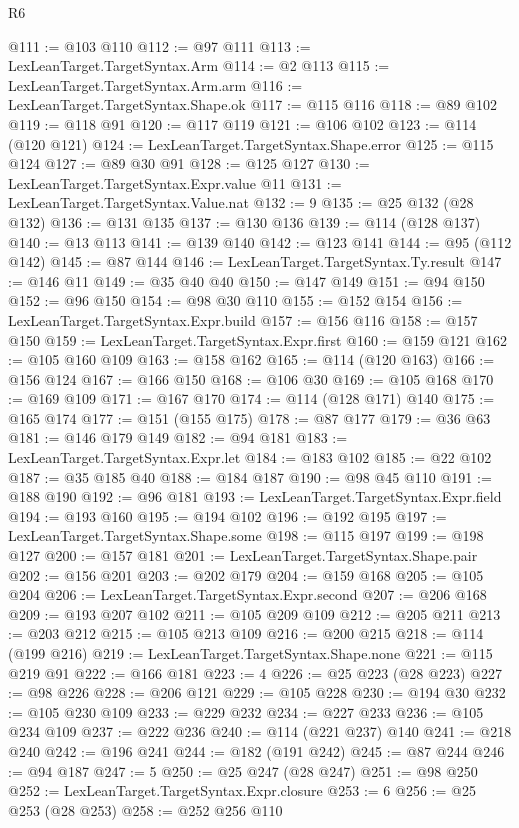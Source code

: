 \begin{lexlean}{R6}
\begin{coremodule}
@111 := @103 @110
@112 := @97 @111
@113 := LexLeanTarget.TargetSyntax.Arm
@114 := @2 @113
@115 := LexLeanTarget.TargetSyntax.Arm.arm
@116 := LexLeanTarget.TargetSyntax.Shape.ok
@117 := @115 @116
@118 := @89 @102
@119 := @118 @91
@120 := @117 @119
@121 := @106 @102
@123 := @114 (@120 @121)
@124 := LexLeanTarget.TargetSyntax.Shape.error
@125 := @115 @124
@127 := @89 @30 @91
@128 := @125 @127
@130 := LexLeanTarget.TargetSyntax.Expr.value @11
@131 := LexLeanTarget.TargetSyntax.Value.nat
@132 := 9
@135 := @25 @132 (@28 @132)
@136 := @131 @135
@137 := @130 @136
@139 := @114 (@128 @137)
@140 := @13 @113
@141 := @139 @140
@142 := @123 @141
@144 := @95 (@112 @142)
@145 := @87 @144
@146 := LexLeanTarget.TargetSyntax.Ty.result
@147 := @146 @11
@149 := @35 @40 @40
@150 := @147 @149
@151 := @94 @150
@152 := @96 @150
@154 := @98 @30 @110
@155 := @152 @154
@156 := LexLeanTarget.TargetSyntax.Expr.build
@157 := @156 @116
@158 := @157 @150
@159 := LexLeanTarget.TargetSyntax.Expr.first
@160 := @159 @121
@162 := @105 @160 @109
@163 := @158 @162
@165 := @114 (@120 @163)
@166 := @156 @124
@167 := @166 @150
@168 := @106 @30
@169 := @105 @168
@170 := @169 @109
@171 := @167 @170
@174 := @114 (@128 @171) @140
@175 := @165 @174
@177 := @151 (@155 @175)
@178 := @87 @177
@179 := @36 @63
@181 := @146 @179 @149
@182 := @94 @181
@183 := LexLeanTarget.TargetSyntax.Expr.let
@184 := @183 @102
@185 := @22 @102
@187 := @35 @185 @40
@188 := @184 @187
@190 := @98 @45 @110
@191 := @188 @190
@192 := @96 @181
@193 := LexLeanTarget.TargetSyntax.Expr.field
@194 := @193 @160
@195 := @194 @102
@196 := @192 @195
@197 := LexLeanTarget.TargetSyntax.Shape.some
@198 := @115 @197
@199 := @198 @127
@200 := @157 @181
@201 := LexLeanTarget.TargetSyntax.Shape.pair
@202 := @156 @201
@203 := @202 @179
@204 := @159 @168
@205 := @105 @204
@206 := LexLeanTarget.TargetSyntax.Expr.second
@207 := @206 @168
@209 := @193 @207 @102
@211 := @105 @209 @109
@212 := @205 @211
@213 := @203 @212
@215 := @105 @213 @109
@216 := @200 @215
@218 := @114 (@199 @216)
@219 := LexLeanTarget.TargetSyntax.Shape.none
@221 := @115 @219 @91
@222 := @166 @181
@223 := 4
@226 := @25 @223 (@28 @223)
@227 := @98 @226
@228 := @206 @121
@229 := @105 @228
@230 := @194 @30
@232 := @105 @230 @109
@233 := @229 @232
@234 := @227 @233
@236 := @105 @234 @109
@237 := @222 @236
@240 := @114 (@221 @237) @140
@241 := @218 @240
@242 := @196 @241
@244 := @182 (@191 @242)
@245 := @87 @244
@246 := @94 @187
@247 := 5
@250 := @25 @247 (@28 @247)
@251 := @98 @250
@252 := LexLeanTarget.TargetSyntax.Expr.closure
@253 := 6
@256 := @25 @253 (@28 @253)
@258 := @252 @256 @110

\end{coremodule}
\end{lexlean}
